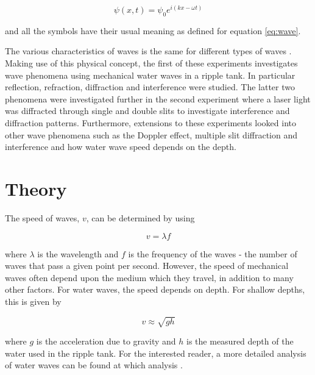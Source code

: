 \documentclass{article}
\begin{document}
\begin{equation}
\label{eq:complex-wave}
\psi(x, t) = \psi_0 e^{i(kx - \omega t)}
\end{equation}

\vspace{2mm}
\noindent
and all the symbols have their usual meaning as defined for equation \eqref{eq:wave}.

\vspace{2mm}
\noindent
The various characteristics of waves is the same for different types of waves \cite{Paper01}. Making use of this physical concept, the first of these experiments investigates wave phenomena using mechanical water waves in a ripple tank. In particular reflection, refraction, diffraction and interference were studied. The latter two phenomena were investigated further in the second experiment where a laser light was diffracted through single and double slits to investigate interference and diffraction patterns. Furthermore, extensions to these experiments looked into other wave phenomena such as the Doppler effect, multiple slit diffraction and interference and how water wave speed depends on the depth.


\section{Theory}
\label{sec:theory}

The speed of waves, $v$, can be determined by using 

\begin{equation}
\label{eq:wave-speed}
v = \lambda f
\end{equation}

\vspace{2mm}
\noindent
where $\lambda$ is the wavelength and $f$ is the frequency of the waves - the number of waves that pass a given point per second. However, the speed of mechanical waves often depend upon the medium which they travel, in addition to many other factors. For water waves, the speed depends on depth. For shallow depths, this is given by \cite{Book02}

\begin{equation}
\label{eq:water-waves}
v \approx \sqrt{gh}
\end{equation}

\vspace{2mm}
\noindent
where $g$ is the acceleration due to gravity and $h$ is the measured depth of the water used in the ripple tank. For the interested reader, a more detailed analysis of water waves can be found at which analysis \cite{Book02}. 
\end{document}
